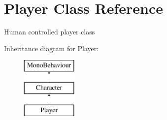 \hypertarget{class_player}{}\section{Player Class Reference}
\label{class_player}


Human controlled player class  


Inheritance diagram for Player\+:\begin{figure}[H]
\begin{center}
\leavevmode
\includegraphics[height=3.000000cm]{class_player}
\end{center}
\end{figure}
